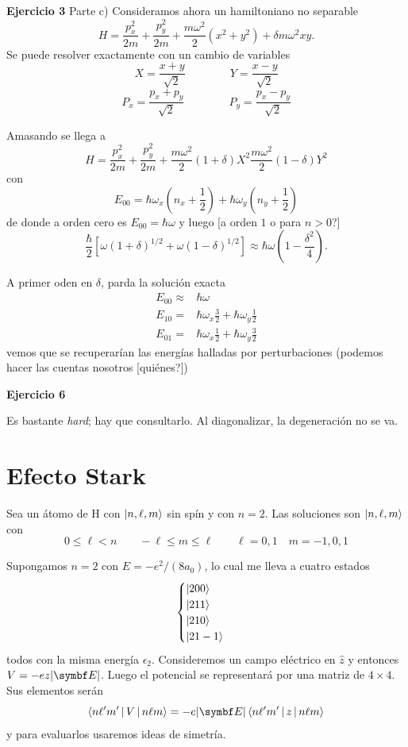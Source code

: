 \documentclass[10pt,oneside]{CBFT_book}
\begin{document}
\begin{ejemplo}{\bf Ejercicio 3}
Parte c)
Consideramos ahora un hamiltoniano no separable
\[
	H = \frac{p_x^2}{2m} + \frac{p_y^2}{2m} + \frac{ m \omega^2}{2}( x^2 + y^2 ) 
	+ \delta m \omega^2 x y. 
\]
Se puede resolver exactamente con un cambio de variables
\[
	X = \frac{x+y}{\sqrt{2}} \qquad \qquad Y = \frac{x-y}{\sqrt{2}}
\]
\[
	P_x = \frac{ p_x + p_y }{\sqrt{2}} \qquad \qquad P_y = \frac{ p_x - p_y }{\sqrt{2}}
\]

Amasando se llega a
\[
	H = \frac{p_x^2}{2m} + \frac{p_y^2}{2m} + \frac{ m \omega^2}{2}( 1 + \delta ) X^2  
	\frac{ m \omega^2}{2}( 1 - \delta ) Y^2
\]
con
\[
	E_{00} = \hbar \omega_x \left( n_x + \frac 1 2 \right) +
	\hbar \omega_y \left( n_y + \frac 1 2 \right)
\]
de donde a orden cero es $E_{00} = \hbar \omega$ y luego [a orden $1$ o para $n>0$?]
\[
	\frac{\hbar}{2} \left[ \omega ( 1 + \delta )^{1/2} + \omega ( 1 - \delta )^{1/2} \right]
	\approx \hbar \omega \left( 1 - \frac {\delta^2} 4 \right).
\]

A primer oden en $\delta$, parda la solución exacta
\begin{eqnarray*}
	E_{00} \approx & \hbar \omega \\
	E_{10} = & \hbar \omega_x \frac{3}{2}  + \hbar \omega_y \frac{1}{2} \\
	E_{01} = & \hbar \omega_x \frac{1}{2} + \hbar \omega_y \frac{3}{2}
\end{eqnarray*}
vemos que se recuperarían las energías halladas por perturbaciones (podemos hacer las cuentas nosotros [quiénes?])


\end{ejemplo}

\begin{ejemplo}{\bf Ejercicio 6}
 
Es bastante {\it hard}; hay que consultarlo. Al diagonalizar, la degeneración no se va. 
 
\end{ejemplo}


\section{Efecto Stark}

Sea un átomo de H con $\Ket{n,\ell,m}$ sin spín y con $n=2$. 
Las soluciones son $\Ket{n,\ell,m}$ con
\[
	0 \leq \ell < n \qquad -\ell \leq m\leq \ell \qquad \ell=0,1 \quad m=-1,0,1
\]

Supongamos $n=2$ con $ E = - e^2 /(8a_0) $, lo cual me lleva a cuatro estados 
\[
	\begin{cases}
	 \Ket{200} \\
	 \Ket{211} \\
	 \Ket{210} \\
	 \Ket{21-1} \\
	\end{cases}
\]
todos con la misma energía $\epsilon_2$.
Consideremos un campo eléctrico en $\hat{z}$ y entonces $V=-ez|\vb{E}|$. 
Luego el potencial se representará por una matriz de $4\times 4$. Sus elementos
serán
\[
	\Braket{n\ell'm'|V|n\ell m} = -e|\vb{E}|\Braket{n\ell'm'|z|n\ell m}
\]
y para evaluarlos usaremos ideas de simetría.
\end{document}
